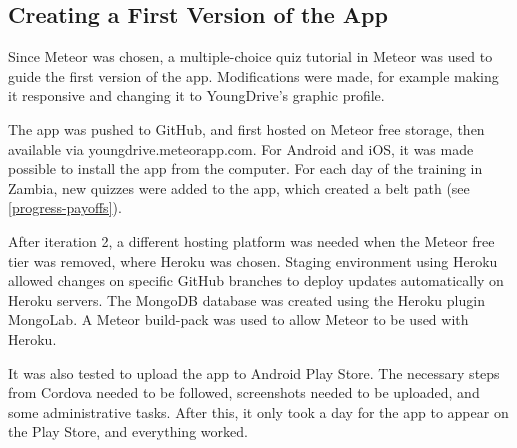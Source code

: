 
\subsection{Creating a First Version of the App}
Since Meteor was chosen, a multiple-choice quiz tutorial in Meteor was used to guide the first version of the app. Modifications were made, for example making it responsive and changing it to YoungDrive's graphic profile.

The app was pushed to GitHub, and first hosted on Meteor free storage, then available via youngdrive.meteorapp.com. For Android and iOS, it was made possible to install the app from the computer.  For each day of the training in Zambia, new quizzes were added to the app, which created a belt path (see \ref{progress-payoffs}).

After iteration 2, a different hosting platform was needed when the Meteor free tier was removed, where Heroku was chosen. Staging environment using Heroku allowed changes on specific GitHub branches to deploy updates automatically on Heroku servers. The MongoDB database was created using the Heroku plugin MongoLab. A Meteor build-pack was used to allow Meteor to be used with Heroku.

It was also tested to upload the app to Android Play Store. The necessary steps from Cordova needed to be followed, screenshots needed to be uploaded, and some administrative tasks. After this, it only took a day for the app to appear on the Play Store, and everything worked.
